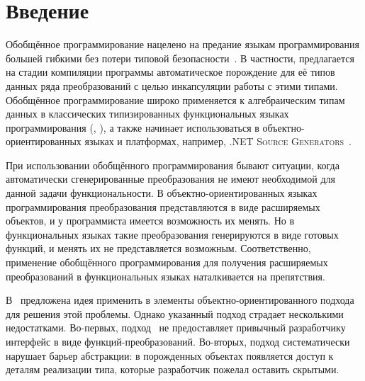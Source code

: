 \section{Введение}


Обобщённое программирование нацелено на предание  языкам программирования большей гибкими без потери  типовой безопасности~\cite{DGP}.
В частности, предлагается  на стадии компиляции программы автоматическое порождение   для её типов данных ряда преобразований с целью инкапсуляции работы с этими типами. Обобщённое программирование широко применяется  к алгебраическим типам данных в  классических типизированных функциональных языках программирования (\ocaml{}, \haskell{}), а также начинает использоваться в объектно-ориентированных языках и платформах, например, \textsc{.NET Source Generators}~\cite{dotNetSG}.

При использовании обобщённого программирования бывают ситуации, когда автоматически сгенерированные преобразования не имеют необходимой для данной задачи функциональности. В объектно-ориентированных языках программирования  преобразования представляются в виде расширяемых объектов, и у программиста имеется возможность их менять. Но в функциональных языках такие преобразования генерируются в виде готовых функций, и менять их не представляется возможным.  Соответственно, применение обобщённого программирования для получения расширяемых преобразований в функциональных языках наталкивается на препятствия.

В~\cite{Visitors} предложена идея применить в \OCaml{} 
элементы объектно-ориентированного подхода для решения этой проблемы.
Однако указанный подход страдает несколькими недостатками. Во-первых, 
подход~\cite{Visitors} не предоставляет привычный разработчику интерфейс в виде функций-преобразований. Во-вторых, подход систематически нарушает барьер абстракции: в порожденных объектах появляется доступ к деталям реализации типа, которые разработчик пожелал оставить скрытыми.

